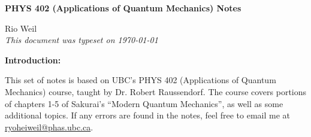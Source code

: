 \documentclass[10pt]{article}
\begin{document}
\begin{tcolorbox}
  \begin{center}
  \begin{Large}
    \textbf{PHYS 402 (Applications of Quantum Mechanics) Notes} \\
    \vspace{5pt}
  \end{Large}
  \begin{large}
        Rio Weil \\
\vspace{5pt}
    \emph{This document was typeset on \today}
  \end{large}
  \end{center}
\end{tcolorbox}

\begin{center}
  \textbf{Introduction:}

  This set of notes is based on UBC's PHYS 402 (Applications of Quantum Mechanics) course, taught by Dr. Robert Raussendorf. The course covers portions of chapters 1-5 of Sakurai's ``Modern Quantum Mechanics'', as well as some additional topics. If any errors are found in the notes, feel free to email me at \href{mailto:ryoheiweil@phas.ubc.ca}{ryoheiweil@phas.ubc.ca}.

\end{center}
\tableofcontents

\newpage


\newpage


\newpage


\newpage


\newpage

\end{document}
